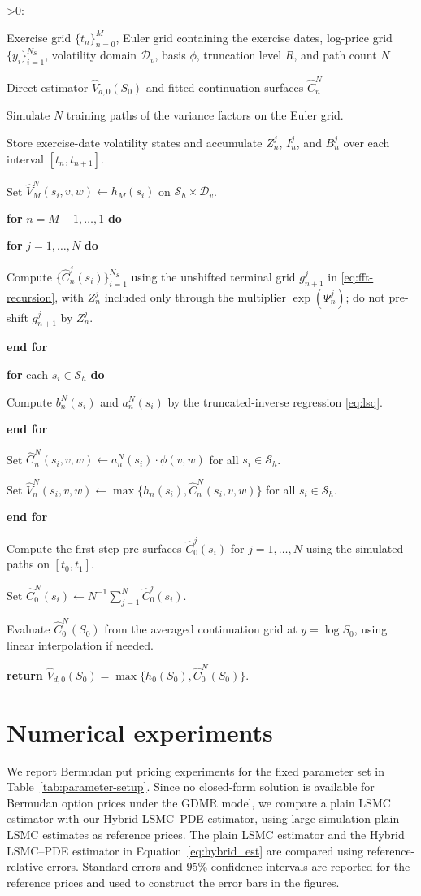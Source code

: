 \documentclass[pdflatex,sn-mathphys-num]{sn-jnl}
\makeatletter
\newcounter{ALG@line}
\newenvironment{algorithmic}[1][0]{%
  \setcounter{ALG@line}{0}%
  \def\ALG@freq{#1}%
  \begin{list}{\ifnum\ALG@freq>0\refstepcounter{ALG@line}\arabic{ALG@line}:\fi}{%
\setlength{\leftmargin}{2.2em}%
\setlength{\labelwidth}{1.8em}%
\setlength{\labelsep}{0.4em}%
\setlength{\itemsep}{2pt}%
\setlength{\parsep}{0pt}%
\setlength{\topsep}{3pt}%
  }%
}{\end{list}}
\newcommand{\Require}{\item[\textbf{Require:}]}
\newcommand{\Ensure}{\item[\textbf{Ensure:}]}
\newcommand{\State}{\item}
\newcommand{\For}[1]{\State \textbf{for} #1 \textbf{do}}
\newcommand{\EndFor}{\State \textbf{end for}}
\theoremstyle{thmstyleone}%
\theoremstyle{thmstylethree}%
\theoremstyle{thmstyletwo}%
\makeatother
\begin{document}
\begin{algorithm}[H]
\caption{Hybrid LSMC--PDE recursion}\label{alg:hybrid-lsmc-pde}
\begin{algorithmic}[1]
\Require Exercise grid $\{t_n\}_{n=0}^M$, Euler grid containing the exercise dates, log-price grid $\{y_i\}_{i=1}^{N_S}$, volatility domain $\mathcal D_v$, basis $\phi$, truncation level $R$, and path count $N$
\Ensure Direct estimator $\widehat V_{d,0}(S_0)$ and fitted continuation surfaces $\widehat C_n^N$
\State Simulate $N$ training paths of the variance factors on the Euler grid.
\State Store exercise-date volatility states and accumulate $Z_n^j$, $I_n^j$, and $B_n^j$ over each interval $[t_n,t_{n+1}]$.
\State Set $\widehat V_M^N(s_i,v,w)\gets h_M(s_i)$ on $\mathcal S_h\times\mathcal D_v$.
\For{$n=M-1,\ldots,1$}
\For{$j=1,\ldots,N$}
\State Compute $\{\widehat C_n^j(s_i)\}_{i=1}^{N_S}$ using the unshifted terminal grid $g_{n+1}^j$ in \eqref{eq:fft-recursion}, with $Z_n^j$ included only through the multiplier $\exp(\Psi_n^j)$; do not pre-shift $g_{n+1}^j$ by $Z_n^j$.
\EndFor
\For{each $s_i\in\mathcal S_h$}
\State Compute $b_n^N(s_i)$ and $a_n^N(s_i)$ by the truncated-inverse regression \eqref{eq:lsq}.
\EndFor
\State Set $\widehat C_n^N(s_i,v,w)\gets a_n^N(s_i)\cdot\phi(v,w)$ for all $s_i\in\mathcal S_h$.
\State Set $\widehat V_n^N(s_i,v,w)\gets\max\{h_n(s_i),\widehat C_n^N(s_i,v,w)\}$ for all $s_i\in\mathcal S_h$.
\EndFor
\State Compute the first-step pre-surfaces $\widehat C_0^j(s_i)$ for $j=1,\ldots,N$ using the simulated paths on $[t_0,t_1]$.
\State Set $\widehat C_0^N(s_i)\gets N^{-1}\sum_{j=1}^{N}\widehat C_0^j(s_i)$.
\State Evaluate $\widehat C_0^N(S_0)$ from the averaged continuation grid at $y=\log S_0$, using linear interpolation if needed.
\State \textbf{return} $\widehat V_{d,0}(S_0)=\max\{h_0(S_0),\widehat C_0^N(S_0)\}$.
\end{algorithmic}
\end{algorithm}
\section{Numerical experiments}\label{sec:numerical}

We report Bermudan put pricing experiments for the fixed parameter set in
Table~\ref{tab:parameter-setup}. Since no closed-form solution is available
for Bermudan option prices under the GDMR model, we compare a plain LSMC
estimator with our Hybrid LSMC--PDE estimator, using large-simulation plain LSMC
estimates as reference prices. The plain LSMC estimator
\cite{longstaff2001valuing} and the Hybrid LSMC--PDE estimator in
Equation~\eqref{eq:hybrid_est} are compared using reference-relative errors.
Standard errors and 95\% confidence intervals are reported for the reference
prices and used to construct the error bars in the figures.
\end{document}
